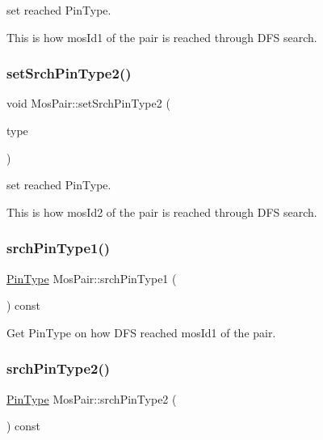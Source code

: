 set reached Pin\+Type. 

This is how mos\+Id1 of the pair is reached through D\+FS search. \mbox{\label{classMosPair_a0a6573b1ad04183fde75d60c887f9a9b}} 
\subsubsection{\texorpdfstring{set\+Srch\+Pin\+Type2()}{setSrchPinType2()}}
{\footnotesize\ttfamily void Mos\+Pair\+::set\+Srch\+Pin\+Type2 (\begin{DoxyParamCaption}\item[{\hyperlink{type_8h_afaab50027002ecbb6c8ac27e727d1bb4}{Pin\+Type}}]{type }\end{DoxyParamCaption})\hspace{0.3cm}{\ttfamily [inline]}}



set reached Pin\+Type. 

This is how mos\+Id2 of the pair is reached through D\+FS search. \mbox{\label{classMosPair_ad0de45e3e866860a50715a01edcd4422}} 
\subsubsection{\texorpdfstring{srch\+Pin\+Type1()}{srchPinType1()}}
{\footnotesize\ttfamily \hyperlink{type_8h_afaab50027002ecbb6c8ac27e727d1bb4}{Pin\+Type} Mos\+Pair\+::srch\+Pin\+Type1 (\begin{DoxyParamCaption}{ }\end{DoxyParamCaption}) const\hspace{0.3cm}{\ttfamily [inline]}}



Get Pin\+Type on how D\+FS reached mos\+Id1 of the pair. 

\mbox{\label{classMosPair_aae7ff1f0f5a50dd2d849e00a3de2225a}} 
\subsubsection{\texorpdfstring{srch\+Pin\+Type2()}{srchPinType2()}}
{\footnotesize\ttfamily \hyperlink{type_8h_afaab50027002ecbb6c8ac27e727d1bb4}{Pin\+Type} Mos\+Pair\+::srch\+Pin\+Type2 (\begin{DoxyParamCaption}{ }\end{DoxyParamCaption}) const\hspace{0.3cm}{\ttfamily [inline]}}



